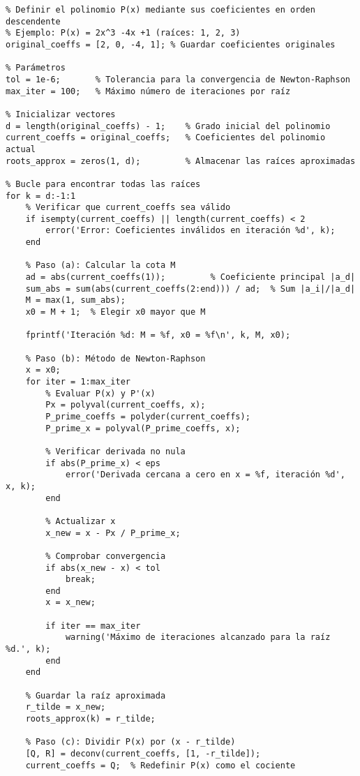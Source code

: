 \begin{homeworkProblem}
\begin{solucion}
\begin{itemize}
\begin{lstlisting}
% Definir el polinomio P(x) mediante sus coeficientes en orden descendente
% Ejemplo: P(x) = 2x^3 -4x +1 (raíces: 1, 2, 3)
original_coeffs = [2, 0, -4, 1]; % Guardar coeficientes originales

% Parámetros
tol = 1e-6;       % Tolerancia para la convergencia de Newton-Raphson
max_iter = 100;   % Máximo número de iteraciones por raíz

% Inicializar vectores
d = length(original_coeffs) - 1;    % Grado inicial del polinomio
current_coeffs = original_coeffs;   % Coeficientes del polinomio actual
roots_approx = zeros(1, d);         % Almacenar las raíces aproximadas

% Bucle para encontrar todas las raíces
for k = d:-1:1
    % Verificar que current_coeffs sea válido
    if isempty(current_coeffs) || length(current_coeffs) < 2
        error('Error: Coeficientes inválidos en iteración %d', k);
    end
    
    % Paso (a): Calcular la cota M
    ad = abs(current_coeffs(1));         % Coeficiente principal |a_d|
    sum_abs = sum(abs(current_coeffs(2:end))) / ad;  % Sum |a_i|/|a_d|
    M = max(1, sum_abs);
    x0 = M + 1;  % Elegir x0 mayor que M
    
    fprintf('Iteración %d: M = %f, x0 = %f\n', k, M, x0);
    
    % Paso (b): Método de Newton-Raphson
    x = x0;
    for iter = 1:max_iter
        % Evaluar P(x) y P'(x)
        Px = polyval(current_coeffs, x);
        P_prime_coeffs = polyder(current_coeffs);
        P_prime_x = polyval(P_prime_coeffs, x);
        
        % Verificar derivada no nula
        if abs(P_prime_x) < eps
            error('Derivada cercana a cero en x = %f, iteración %d', x, k);
        end
        
        % Actualizar x
        x_new = x - Px / P_prime_x;
        
        % Comprobar convergencia
        if abs(x_new - x) < tol
            break;
        end
        x = x_new;
        
        if iter == max_iter
            warning('Máximo de iteraciones alcanzado para la raíz %d.', k);
        end
    end
    
    % Guardar la raíz aproximada
    r_tilde = x_new;
    roots_approx(k) = r_tilde;
    
    % Paso (c): Dividir P(x) por (x - r_tilde)
    [Q, R] = deconv(current_coeffs, [1, -r_tilde]);
    current_coeffs = Q;  % Redefinir P(x) como el cociente
    

\end{lstlisting}
\end{itemize}
\end{solucion}
\end{homeworkProblem}
